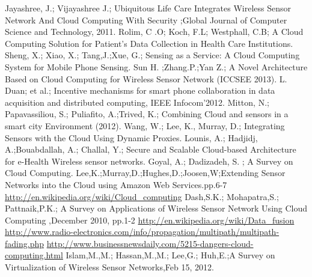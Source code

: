 \documentclass {report}
\begin{document}
\begin{thebibliography}{samplelabel}

 Jayashree, J.; Vijayashree J.; Ubiquitous Life Care Integrates Wireless Sensor Network And Cloud Computing With Security ;Global Journal of  Computer Science and Technology, 2011.
 Rolim, C .O; Koch, F.L; Westphall, C.B; A Cloud Computing Solution for Patient's Data Collection in Health Care Institutions.
 Sheng, X.; Xiao, X.; Tang,J.;Xue, G.; Sensing as a Service: A Cloud Computing System for Mobile Phone Sensing.
 Sun H. ;Zhang.P.;Yan Z.; A Novel Architecture Based on Cloud Computing for Wireless Sensor Network  (ICCSEE 2013).
 L. Duan; et al.; Incentive mechanisms for smart phone collaboration in data acquisition and distributed computing, IEEE Infocom’2012.
 Mitton, N.; Papavassiliou, S.; Puliafito, A.;Trived, K.; Combining Cloud and sensors in a smart city Environment (2012).
 Wang, W.; Lee, K., Murray, D.; Integrating Sensors with the Cloud Using Dynamic Proxies.
 Lounis, A.;  Hadjidj, A.;Bouabdallah, A.; Challal, Y.; Secure and Scalable Cloud-based Architecture for e-Health Wireless sensor networks.
Goyal, A.;  Dadizadeh, S. ; A Survey on Cloud Computing.
 Lee,K.;Murray,D.;Hughes,D.;Joosen,W;Extending Sensor Networks into the Cloud using Amazon Web Services.pp.6-7
\url{http://en.wikipedia.org/wiki/Cloud_computing}
Dash,S.K.; Mohapatra,S.;  Pattnaik,P.K.; A Survey on Applications of Wireless Sensor Network Using Cloud Computing ,December 2010, pp.1-2
 \url{http://en.wikipedia.org/wiki/Data_fusion}
\url{ http://www.radio-electronics.com/info/propagation/multipath/multipath-fading.php}
\url{http://www.businessnewsdaily.com/5215-dangers-cloud-computing.html}
  Islam,M.,M.;  Hassan,M.,M.; Lee,G.; Huh,E.;A Survey on Virtualization of Wireless Sensor Networks,Feb 15, 2012.


\end{thebibliography}
\end{document}
